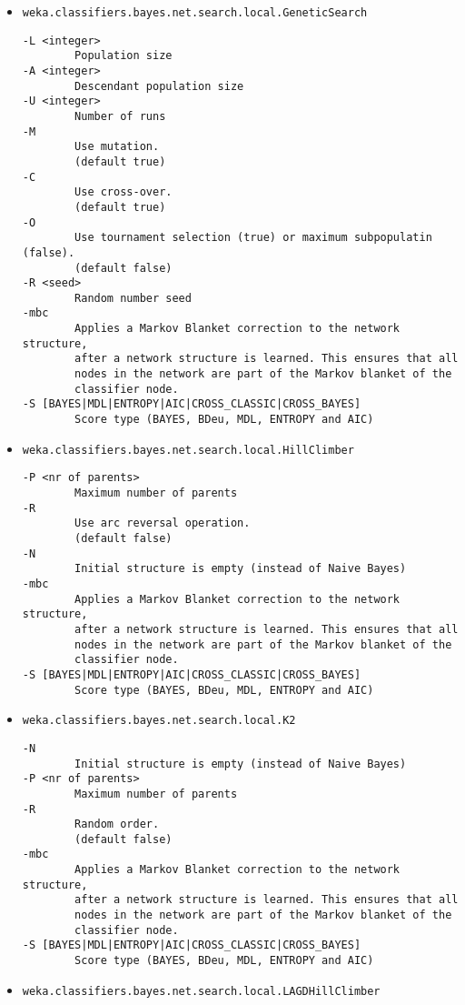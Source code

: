 \begin{itemize}
\item \texttt{weka.classifiers.bayes.net.search.local.GeneticSearch}
  \begin{verbatim}
-L <integer>
        Population size
-A <integer>
        Descendant population size
-U <integer>
        Number of runs
-M
        Use mutation.
        (default true)
-C
        Use cross-over.
        (default true)
-O
        Use tournament selection (true) or maximum subpopulatin (false).
        (default false)
-R <seed>
        Random number seed
-mbc
        Applies a Markov Blanket correction to the network structure,
        after a network structure is learned. This ensures that all
        nodes in the network are part of the Markov blanket of the
        classifier node.
-S [BAYES|MDL|ENTROPY|AIC|CROSS_CLASSIC|CROSS_BAYES]
        Score type (BAYES, BDeu, MDL, ENTROPY and AIC)
  \end{verbatim}
\item \texttt{weka.classifiers.bayes.net.search.local.HillClimber}
  \begin{verbatim}
-P <nr of parents>
        Maximum number of parents
-R
        Use arc reversal operation.
        (default false)
-N
        Initial structure is empty (instead of Naive Bayes)
-mbc
        Applies a Markov Blanket correction to the network structure,
        after a network structure is learned. This ensures that all
        nodes in the network are part of the Markov blanket of the
        classifier node.
-S [BAYES|MDL|ENTROPY|AIC|CROSS_CLASSIC|CROSS_BAYES]
        Score type (BAYES, BDeu, MDL, ENTROPY and AIC)
  \end{verbatim}
\item \texttt{weka.classifiers.bayes.net.search.local.K2}
  \begin{verbatim}
-N
        Initial structure is empty (instead of Naive Bayes)
-P <nr of parents>
        Maximum number of parents
-R
        Random order.
        (default false)
-mbc
        Applies a Markov Blanket correction to the network structure,
        after a network structure is learned. This ensures that all
        nodes in the network are part of the Markov blanket of the
        classifier node.
-S [BAYES|MDL|ENTROPY|AIC|CROSS_CLASSIC|CROSS_BAYES]
        Score type (BAYES, BDeu, MDL, ENTROPY and AIC)
  \end{verbatim}
\item \texttt{weka.classifiers.bayes.net.search.local.LAGDHillClimber}
  \begin{verbatim}

\end{verbatim}
\end{itemize}
